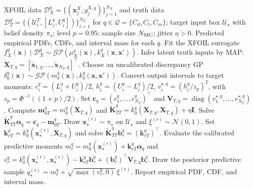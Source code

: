 \documentclass[a4paper,12pt]{article}
\begin{document}
\begin{algorithm}[t]
\footnotesize
\caption{Latent input distributional calibration and Monte Carlo propagation}
\label{alg:latent_dc_mc}
\begin{algorithmic}[1]
\Require XFOIL data $\mathcal{D}_X^q= \{ ( \mathbf{x}_{j}^{X},y_{j}^{X,q} ) \}_{j=1}^{N_X}$ and truth data
$\mathcal{D}_T^q=\{(\mathcal{U}_i^T,[L_i^q,U_i^q])\}_{i=1}^{N_T}$ for
$q\in\mathcal{Q}=\{C_d,C_l,C_m\}$; target input box $\mathcal{U}_\star$ with belief density
$\pi_\star$; level $p=0.95$; sample size $N_{\rm MC}$; jitter $\eta>0$.
\Ensure Predicted empirical PDFs, CDFs, and interval mass for each $q$.
    \State Fit the XFOIL surrogate
    $f_X^q(\mathbf{x})\mid\mathcal{D}_X^q\sim
    \mathcal{GP}(\mu_X^q(\mathbf{x}),k_X^q(\mathbf{x},\mathbf{x}'))$.
    \State Infer latent truth inputs by MAP: $\mathbf{X}_{T,q}=[\widetilde{\mathbf{x}}_{1,q},\ldots,
    \widetilde{\mathbf{x}}_{N_T,q}]^\top$.
    \State Choose an uncalibrated discrepancy GP
    $\delta_0^q(\mathbf{x})\sim
    \mathcal{GP}(m_\delta^q(\mathbf{x}),k_\delta^q(\mathbf{x},\mathbf{x}'))$.
    \State Convert output intervals to target moments:
    $c_i^q=(L_i^q+U_i^q)/2$,
    $h_i^q=(U_i^q-L_i^q)/2$,
    $v_i^{\star,q}=(h_i^q/z_p)^2$, with
    $z_p=\Phi^{-1}((1+p)/2)$. Set
    $\mathbf{c}_q=(c_1^q,\ldots,c_{N_T}^q)^\top$ and
    $\mathbf{V}_{T,q}=\operatorname{diag}(v_1^{\star,q},\ldots,v_{N_T}^{\star,q})$.
    \State Compute $\mathbf{m}_{0T}^q=m_0^q(\mathbf{X}_{T,q})$ and
    $\widetilde{\mathbf{K}}_{TT}^q
    =k_0^q(\mathbf{X}_{T,q},\mathbf{X}_{T,q})+\eta\mathbf{I}$.
    Solve
    $\widetilde{\mathbf{K}}_{TT}^q\boldsymbol{\alpha}_q
    =\mathbf{c}_q-\mathbf{m}_{0T}^q$.
        \State Draw $\mathbf{x}_\star^{(r)}\sim\pi_\star$ on $\mathcal{U}_\star$ and
        $\xi^{(r)}\sim\mathcal{N}(0,1)$.
        \State Set $\mathbf{k}_{rT}^q
        =k_0^q(\mathbf{x}_\star^{(r)},\mathbf{X}_{T,q})$ and solve
        $\widetilde{\mathbf{K}}_{TT}^q\mathbf{b}_r^q=(\mathbf{k}_{rT}^q)^\top$.
        \State Evaluate the calibrated predictive moments
        $m_r^q=m_0^q(\mathbf{x}_\star^{(r)})+\mathbf{k}_{rT}^q\boldsymbol{\alpha}_q$ and
        $v_r^q=k_0^q(\mathbf{x}_\star^{(r)},\mathbf{x}_\star^{(r)})
        -\mathbf{k}_{rT}^q\mathbf{b}_r^q
        +(\mathbf{b}_r^q)^\top\mathbf{V}_{T,q}\mathbf{b}_r^q$.
        \State Draw the posterior predictive sample
        $q_\star^{(r)}=m_r^q+\sqrt{\max(v_r^q,0)}\,\xi^{(r)}$.
    \EndFor
    \State Report empirical PDF, CDF, and interval mass.
\EndFor
\end{algorithmic}
\end{algorithm}
\end{document}
